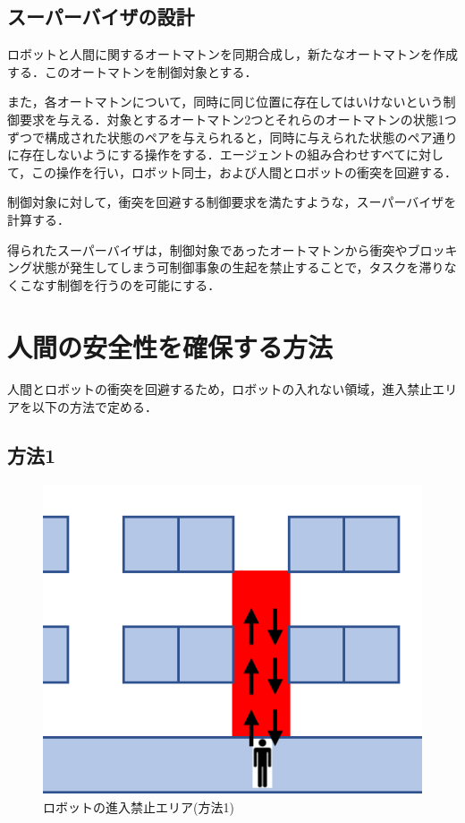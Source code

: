\subsection{スーパーバイザの設計}
ロボットと人間に関するオートマトンを同期合成し，新たなオートマトンを作成する．このオートマトンを制御対象とする．

また，各オートマトンについて，同時に同じ位置に存在してはいけないという制御要求を与える．対象とするオートマトン2つとそれらのオートマトンの状態1つずつで構成された状態のペアを与えられると，同時に与えられた状態のペア通りに存在しないようにする操作をする．エージェントの組み合わせすべてに対して，この操作を行い，ロボット同士，および人間とロボットの衝突を回避する．

制御対象に対して，衝突を回避する制御要求を満たすような，スーパーバイザを計算する．

得られたスーパーバイザは，制御対象であったオートマトンから衝突やブロッキング状態が発生してしまう可制御事象の生起を禁止することで，タスクを滞りなくこなす制御を行うのを可能にする．

\section{{人間の安全性を確保する方法}}
人間とロボットの衝突を回避するため，ロボットの入れない領域，進入禁止エリアを以下の方法で定める．

\subsection{方法1}

\begin{figure}
  \includegraphics[scale=0.3]{figures/Method1.pdf}
  \caption{ロボットの進入禁止エリア(方法1)}
  \label{fig:Method1}
\end{figure}

